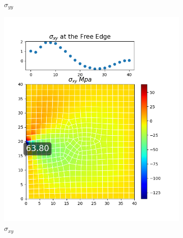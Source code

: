 \documentclass[twoside,twocolumn,10pt]{article}
\begin{document}
\begin{figure}[!ht]
\begin{subfigure}[c]{0.26\textwidth}
    \caption{$\sigma_{yy}$}
    \label{fig:y_quad_0.05}
  \end{subfigure}%
  \hfill
  \begin{subfigure}[c]{0.26\textwidth}
    \includegraphics[width=1.\linewidth]{Q2_5/Q5_0.05_xy_quad.png}
    \caption{$\sigma_{xy}$}
    \label{fig:xy_quad_0.05}
  \end{subfigure}%
  \begin{subfigure}[c]{0.26\textwidth}

\end{subfigure}
\end{figure}
\end{document}

